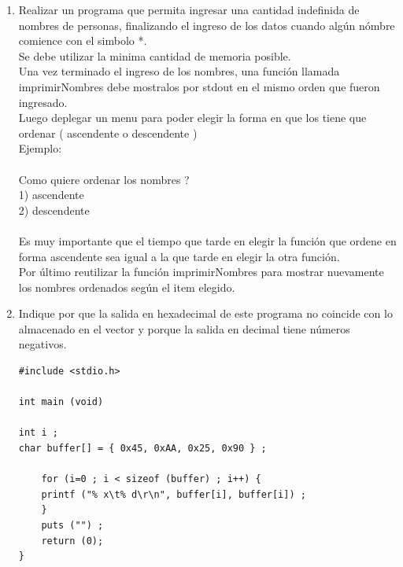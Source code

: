 \documentclass[12pt]{article} %
\begin{document}
\begin{enumerate}
\item Realizar un programa que permita ingresar una cantidad indefinida de nombres de personas, finalizando el ingreso de los datos cuando algún nómbre comience con el simbolo \hspace{0.2cm} {\color{red}*}.\\
Se debe utilizar la minima cantidad de memoria posible.\\
Una vez terminado el ingreso de los nombres, una función llamada {\color{blue}imprimirNombres}  debe mostralos por {\color{red}stdout} en el mismo orden que fueron ingresado.\\
Luego deplegar un menu para poder elegir la forma en que los tiene que ordenar ( ascendente o descendente ) \\
Ejemplo:\\
\\
Como quiere ordenar los nombres ?\\
1) ascendente\\
2) descendente\\
\\
Es muy importante que el tiempo que tarde en elegir la función que ordene en forma ascendente sea igual a la que tarde en elegir la otra función.\\
Por último reutilizar la función {\color{blue}imprimirNombres} para mostrar nuevamente los nombres ordenados según el item elegido.\\

\item Indique por que la salida en hexadecimal de este programa no coincide con lo almacenado en el vector y porque la salida en decimal tiene números negativos.
\begin{lstlisting}
#include <stdio.h> 

int main (void) 

int i ;
char buffer[] = { 0x45, 0xAA, 0x25, 0x90 } ;

	for (i=0 ; i < sizeof (buffer) ; i++) {
	printf ("% x\t% d\r\n", buffer[i], buffer[i]) ;
	}
	puts ("") ;
	return (0);
} 
\end{lstlisting}

\end{enumerate}


 
\end{document}
